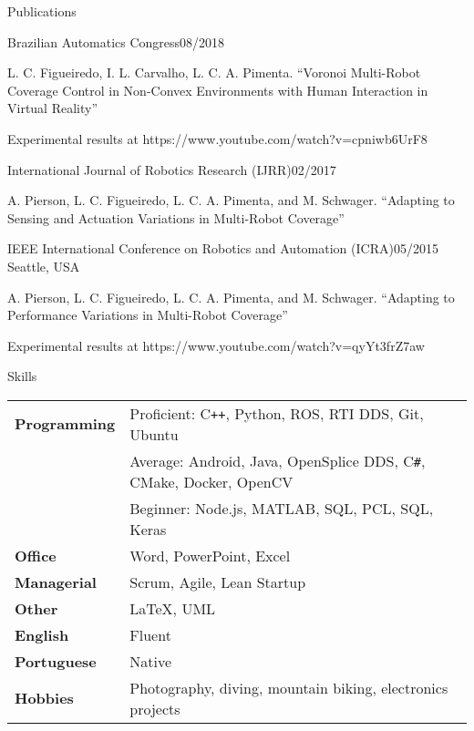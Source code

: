 \documentclass[14pt, a4paper]{resume} %
\begin{document}
\begin{rSection}{Publications}
	
\begin{rSubsection}{Brazilian Automatics Congress}{08/2018}{}{}
	
\item L. C. Figueiredo, I. L. Carvalho, L. C. A. Pimenta. ``Voronoi Multi-Robot Coverage Control in Non-Convex Environments with Human Interaction in Virtual Reality''
\item Experimental results at https://www.youtube.com/watch?v=cpniwb6UrF8

\end{rSubsection}	
	
\begin{rSubsection}{International Journal of Robotics Research (IJRR)}{02/2017}{}{}
	
\item A. Pierson, L. C. Figueiredo, L. C. A. Pimenta, and M. Schwager. ``Adapting to Sensing and Actuation Variations in Multi-Robot Coverage''

\end{rSubsection}

\begin{rSubsection}{IEEE International Conference on Robotics and Automation (ICRA)}{05/2015}{}{ \normalfont Seattle, USA}

\item A. Pierson, L. C. Figueiredo, L. C. A. Pimenta, and M. Schwager. ``Adapting to Performance Variations in Multi-Robot Coverage''
\item Experimental results at https://www.youtube.com/watch?v=qyYt3frZ7aw


\end{rSubsection}


\end{rSection}




\begin{rSection}{Skills}

\begin{tabular}{ @{} >{\bfseries}l @{\hspace{6ex}} l }
Programming & Proficient: C\texttt{++}, Python, ROS, RTI DDS, Git, Ubuntu \\
            & Average: Android, Java, OpenSplice DDS, C\texttt{\#}, CMake, Docker, OpenCV \\ 
            & Beginner: Node.js, MATLAB, SQL, PCL, SQL, Keras \\
Office & Word, PowerPoint, Excel \\
Managerial & Scrum, Agile, Lean Startup \\
Other & LaTeX, UML \\
English & Fluent \\
Portuguese & Native \\
Hobbies & Photography, diving, mountain biking, electronics projects

\end{tabular}

\end{rSection}
\end{document}
